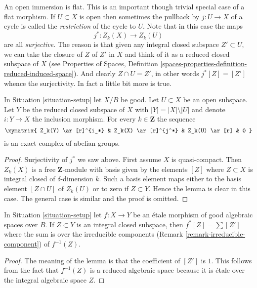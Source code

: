 \noindent
An open immersion is flat. This is an important though trivial special
case of a flat morphism. If $U \subset X$ is open then sometimes the
pullback by $j : U \to X$ of a cycle is called the {\it restriction} of the
cycle to $U$. Note that in this case the maps
$$
j^* : Z_k(X) \longrightarrow Z_k(U)
$$
are all {\it surjective}. The reason is that given any integral closed
subspace $Z' \subset U$, we can take the closure of $Z$ of $Z'$ in $X$
and think of it as a reduced closed subspace of $X$ (see
Properties of Spaces, Definition
\ref{spaces-properties-definition-reduced-induced-space}).
And clearly $Z \cap U = Z'$, in other words
$j^*[Z] = [Z']$ whence the surjectivity. In fact a little bit more
is true.

\begin{lemma}
\label{lemma-exact-sequence-open}
In Situation \ref{situation-setup} let $X/B$ be good.
Let $U \subset X$ be an open subspace. Let $Y$ be the
reduced closed subspace of $X$ with $|Y| = |X| \setminus |U|$
and denote $i : Y \to X$ the inclusion morphism.
For every $k \in \mathbf{Z}$ the sequence
$$
\xymatrix{
Z_k(Y) \ar[r]^{i_*} & Z_k(X) \ar[r]^{j^*} & Z_k(U) \ar[r] & 0
}
$$
is an exact complex of abelian groups.
\end{lemma}

\begin{proof}
Surjectivity of $j^*$ we saw above.
First assume $X$ is quasi-compact. Then $Z_k(X)$ is a free $\mathbf{Z}$-module
with basis given by the elements $[Z]$ where $Z \subset X$ is integral
closed of $\delta$-dimension $k$. Such a basis element maps
either to the basis element $[Z \cap U]$ of $Z_k(U)$
or to zero if $Z \subset Y$.
Hence the lemma is clear in this case. The general case is similar
and the proof is omitted.
\end{proof}

\begin{lemma}
\label{lemma-etale-pullback}
In Situation \ref{situation-setup} let $f : X \to Y$ be an \'etale
morphism of good algebraic spaces over $B$. If $Z \subset Y$ is an integral
closed subspace, then $f^*[Z] = \sum [Z']$ where the sum is over the
irreducible components (Remark \ref{remark-irreducible-component})
of $f^{-1}(Z)$.
\end{lemma}

\begin{proof}
The meaning of the lemma is that the coefficient of $[Z']$ is $1$.
This follows from the fact that $f^{-1}(Z)$ is a reduced algebraic space
because it is \'etale over the integral algebraic space $Z$.
\end{proof}


